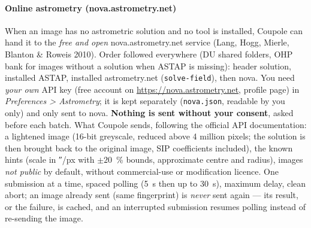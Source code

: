 \paragraph{Online astrometry (nova.astrometry.net)}\label{sec:nova}
When an image has no astrometric solution and no tool is installed, Coupole can hand it to the \emph{free and open}
nova.astrometry.net service (Lang, Hogg, Mierle, Blanton \& Roweis 2010). Order followed everywhere (DU shared
folders, OHP bank for images without a solution when ASTAP is missing): header solution, installed ASTAP, installed
astrometry.net (\texttt{solve-field}), then nova. You need \emph{your own} API key (free account on
\url{https://nova.astrometry.net}, profile page) in \emph{Preferences > Astrometry}; it is kept separately
(\texttt{nova.json}, readable by you only) and only sent to nova. \textbf{Nothing is sent without your consent},
asked before each batch. What Coupole sends, following the official API documentation: a lightened image (16-bit
greyscale, reduced above 4 million pixels; the solution is then brought back to the original image, SIP coefficients
included), the known hints (scale in ″/px with $\pm 20$~\% bounds, approximate centre and radius), images \emph{not
public} by default, without commercial-use or modification licence. One submission at a time, spaced polling (5~s
then up to 30~s), maximum delay, clean abort; an image already sent (same fingerprint) is \emph{never} sent again —
its result, or the failure, is cached, and an interrupted submission resumes polling instead of re-sending the image.

